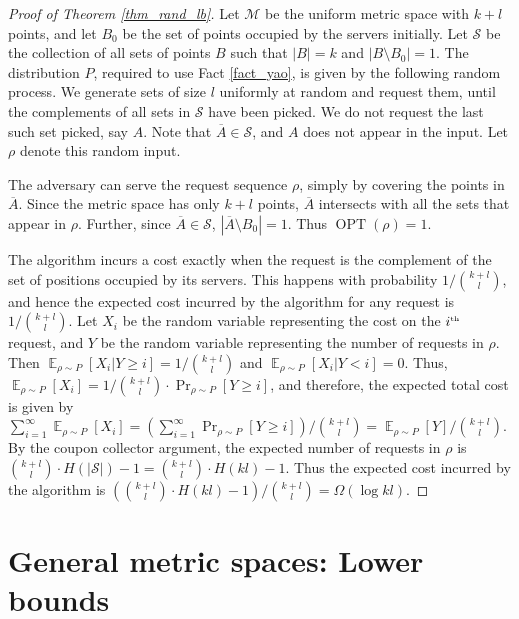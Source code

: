 \documentclass[11pt]{article}
\theoremstyle{plain}\newtheorem{theorem}{Theorem}
\theoremstyle{definition}
\theoremstyle{remark}
\DeclareMathOperator{\opt}{OPT}
\begin{document}
\begin{proof}[Proof of Theorem \ref{thm_rand_lb}]
Let $\mathcal{M}$ be the uniform metric space with $k+l$ points, and let $B_0$ be the set of points occupied by the servers initially. Let $\mathcal{S}$ be the collection of all sets of points $B$ such that $|B|=k$ and $|B\setminus B_0|=1$. The distribution $P$, required to use Fact \ref{fact_yao}, is given by the following random process. We generate sets of size $l$ uniformly at random and request them, until the complements of all sets in $\mathcal{S}$ have been picked. We do not request the last such set picked, say $A$. Note that $\overline{A}\in\mathcal{S}$, and $A$ does not appear in the input. Let $\rho$ denote this random input.

The adversary can serve the request sequence $\rho$, simply by covering the points in $\overline{A}$. Since the metric space has only $k+l$ points, $\overline{A}$ intersects with all the sets that appear in $\rho$. Further, since $\overline{A}\in\mathcal{S}$, $|\overline{A}\setminus B_0|=1$. Thus 
$\opt(\rho)=1$.


The algorithm incurs a cost exactly when the request is the complement of the set of positions occupied by its servers. This happens with probability $1/{{k+l}\choose{l}}$, and hence the expected cost incurred by the algorithm for any request is $1/{{k+l}\choose{l}}$. Let $X_i$ be the random variable representing the cost on the $i^{\text{\tiny{th}}}$ request, and $Y$ be the random variable representing the number of requests in $\rho$. Then $\mathop{\mathbb{E}}_{\rho\sim P}\left[X_i|Y\geq i\right]=1/{{k+l}\choose{l}}$ and $\mathop{\mathbb{E}}_{\rho\sim P}\left[X_i|Y<i\right]=0$. Thus, $\mathop{\mathbb{E}}_{\rho\sim P}\left[X_i\right]=1/{{k+l}\choose{l}}\cdot\Pr_{\rho\sim P}\left[Y\geq i\right]$, and therefore, the expected total cost is given by $\sum_{i=1}^{\infty}\mathop{\mathbb{E}}_{\rho\sim P}\left[X_i\right]=\left(\sum_{i=1}^{\infty}\Pr_{\rho\sim P}\left[Y\geq i\right]\right)/{{k+l}\choose{l}}=\mathop{\mathbb{E}}_{\rho\sim P}\left[Y\right]/{{k+l}\choose{l}}$. 
By the coupon collector argument, the expected number of requests in $\rho$ is ${{k+l}\choose{l}}\cdot H(|\mathcal{S}|)-1={{k+l}\choose{l}}\cdot H(kl)-1$. Thus the expected cost incurred by the algorithm is $\left({{k+l}\choose{l}}\cdot H(kl)-1\right)/{{k+l}\choose{l}}=\Omega(\log kl)$.
\end{proof}

\section{General metric spaces: Lower bounds}\label{sec_general_lb}
\end{document}
